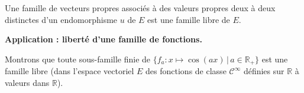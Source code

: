 \documentclass[a4paper,10pt]{report}
\begin{document}
\begin{preuve}
\vspace{12cm}
\end{preuve}

\begin{cor} Une famille de vecteurs propres associés à des valeurs propres deux à deux distinctes d'un endomorphisme $u$ de $E$ est une famille libre de $E$. 
\end{cor}

\newpage
\begin{preuve} 

\vspace{5cm}
\end{preuve}

\medskip
%
%

\noindent \textbf{Application : liberté d'une famille de fonctions.}

\noindent Montrons que toute sous-famille finie de $\lbrace f_a : x \mapsto \cos(ax) \, \vert \, a \in \mathbb{R}_+\rbrace$ est une famille libre (dans l'espace vectoriel $E$ des fonctions de classe $\mathcal{C}^{\infty}$ définies  sur $\mathbb{R}$ à valeurs dans $\mathbb{R}$).

\medskip
%
\end{document}
